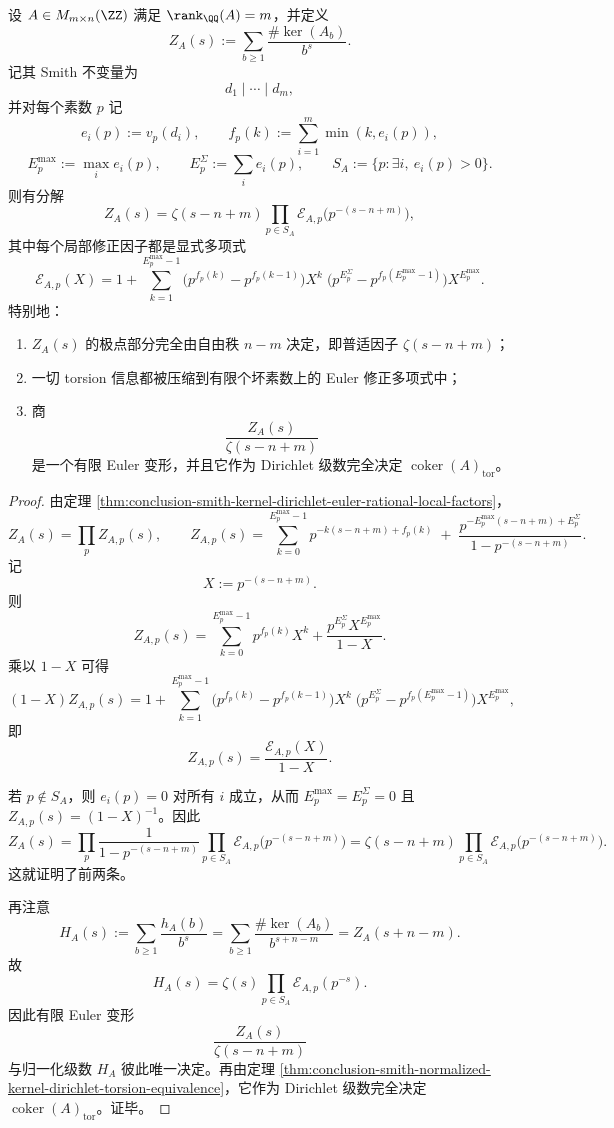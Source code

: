 \begin{theorem}\label{thm:conclusion-smith-kernel-zeta-free-pole-finite-euler-deformation}
设 \(A\in M_{m\times n}(\ZZ)\) 满足 \(\rank_{\QQ}(A)=m\)，并定义
\[
Z_A(s):=\sum_{b\ge 1}\frac{\#\ker(A_b)}{b^s}.
\]
记其 Smith 不变量为
\[
d_1\mid\cdots\mid d_m,
\]
并对每个素数 \(p\) 记
\[
e_i(p):=v_p(d_i),
\qquad
f_p(k):=\sum_{i=1}^{m}\min(k,e_i(p)),
\]
\[
E_p^{\max}:=\max_i e_i(p),
\qquad
E_p^{\Sigma}:=\sum_i e_i(p),
\qquad
S_A:=\{p:\exists i,\ e_i(p)>0\}.
\]
则有分解
\[
Z_A(s)
=
\zeta(s-n+m)
\prod_{p\in S_A}
\mathcal E_{A,p}\!\bigl(p^{-(s-n+m)}\bigr),
\]
其中每个局部修正因子都是显式多项式
\[
\mathcal E_{A,p}(X)
=
1+\sum_{k=1}^{E_p^{\max}-1}
\bigl(p^{f_p(k)}-p^{f_p(k-1)}\bigr)X^k
\;
\bigl(p^{E_p^\Sigma}-p^{f_p(E_p^{\max}-1)}\bigr)X^{E_p^{\max}}.
\]
特别地：
\begin{enumerate}
  \item \(Z_A(s)\) 的极点部分完全由自由秩 \(n-m\) 决定，即普适因子 \(\zeta(s-n+m)\)；
  \item 一切 torsion 信息都被压缩到有限个坏素数上的 Euler 修正多项式中；
  \item 商
  \[
  \frac{Z_A(s)}{\zeta(s-n+m)}
  \]
  是一个有限 Euler 变形，并且它作为 Dirichlet 级数完全决定 \(\operatorname{coker}(A)_{\mathrm{tor}}\)。
\end{enumerate}
\end{theorem}
\begin{proof}
由定理 \ref{thm:conclusion-smith-kernel-dirichlet-euler-rational-local-factors}，
\[
Z_A(s)=\prod_p Z_{A,p}(s),
\qquad
Z_{A,p}(s)
=
\sum_{k=0}^{E_p^{\max}-1}p^{-k(s-n+m)+f_p(k)}
\;+\;
\frac{p^{-E_p^{\max}(s-n+m)+E_p^\Sigma}}{1-p^{-(s-n+m)}}.
\]
记
\[
X:=p^{-(s-n+m)}.
\]
则
\[
Z_{A,p}(s)=\sum_{k=0}^{E_p^{\max}-1}p^{f_p(k)}X^k+\frac{p^{E_p^\Sigma}X^{E_p^{\max}}}{1-X}.
\]
乘以 \(1-X\) 可得
\[
(1-X)Z_{A,p}(s)
=
1+\sum_{k=1}^{E_p^{\max}-1}
\bigl(p^{f_p(k)}-p^{f_p(k-1)}\bigr)X^k
\;
\bigl(p^{E_p^\Sigma}-p^{f_p(E_p^{\max}-1)}\bigr)X^{E_p^{\max}},
\]
即
\[
Z_{A,p}(s)=\frac{\mathcal E_{A,p}(X)}{1-X}.
\]

若 \(p\notin S_A\)，则 \(e_i(p)=0\) 对所有 \(i\) 成立，从而 \(E_p^{\max}=E_p^\Sigma=0\) 且 \(Z_{A,p}(s)=(1-X)^{-1}\)。因此
\[
Z_A(s)
=
\prod_p \frac{1}{1-p^{-(s-n+m)}}
\prod_{p\in S_A}\mathcal E_{A,p}\!\bigl(p^{-(s-n+m)}\bigr)
=
\zeta(s-n+m)\prod_{p\in S_A}\mathcal E_{A,p}\!\bigl(p^{-(s-n+m)}\bigr).
\]
这就证明了前两条。

再注意
\[
H_A(s):=\sum_{b\ge 1}\frac{h_A(b)}{b^s}
=
\sum_{b\ge 1}\frac{\#\ker(A_b)}{b^{s+n-m}}
=
Z_A(s+n-m).
\]
故
\[
H_A(s)=\zeta(s)\prod_{p\in S_A}\mathcal E_{A,p}(p^{-s}).
\]
因此有限 Euler 变形
\[
\frac{Z_A(s)}{\zeta(s-n+m)}
\]
与归一化级数 \(H_A\) 彼此唯一决定。再由定理 \ref{thm:conclusion-smith-normalized-kernel-dirichlet-torsion-equivalence}，它作为 Dirichlet 级数完全决定 \(\operatorname{coker}(A)_{\mathrm{tor}}\)。证毕。
\end{proof}

